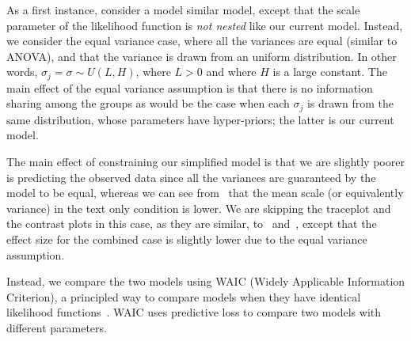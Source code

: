As a first instance, consider a model similar model, except that the scale parameter of the likelihood function is \textit{not nested} like our current model. Instead, we consider the equal variance case, where all the variances are equal (similar to ANOVA), and that the variance is drawn from an uniform distribution. In other words, $\sigma_j = \sigma \sim U(L, H)$, where $L>0$ and where $H$ is a large constant. The main effect of the equal variance assumption is that there is no information sharing among the groups as would be the case when each $\sigma_j$ is drawn from the same distribution, whose parameters have hyper-priors; the latter is our current model.

The main effect of constraining our simplified model is that we are slightly poorer is predicting the observed data since all the variances are guaranteed by the model to be equal, whereas we can see from~ that the mean scale (or equivalently variance) in the text only condition is lower. We are skipping the traceplot and the contrast plots in this case, as they are similar, to~ and~, except that the effect size for the combined case is slightly lower due to the equal variance assumption. 

Instead, we compare the two models using WAIC (Widely Applicable Information Criterion), a principled way to compare models when they have identical likelihood functions~\parencite{Gelman2014a}. WAIC uses predictive loss to compare two models with different parameters.





